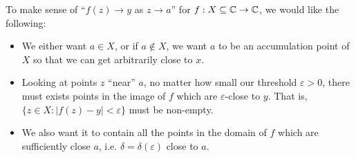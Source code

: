 \documentclass[../main.tex]{subfiles}
\begin{document}
To make sense of ``$f(z) \to y$ as $z \to a$'' for $f: X \subseteq \mathbb{C} \to \mathbb{C}$, we would like the following:
\begin{itemize}
  \item We either want $a \in X$, or if $a \notin X$, we want $a$ to be an accumulation point of $X$ so that we can get arbitrarily close to $x$.
  \item Looking at points $z$ ``near'' $a$, no matter how small our threshold $\varepsilon > 0$, there must exists points in the image of $f$ which are $\varepsilon$-close to $y$.
  That is, $\{z \in X: |f(z) - y| < \varepsilon\}$ must be non-empty.
\item We also want it to contain all the points in the domain of $f$ which are sufficiently close $a$, i.e. $\delta = \delta(\varepsilon)$ close to $a$.
\end{itemize}
\end{document}
